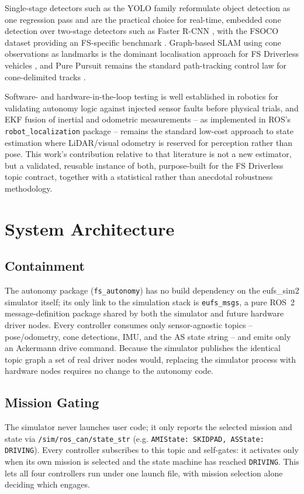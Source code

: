 \documentclass[conference]{IEEEtran}
\begin{document}
Single-stage detectors such as the YOLO family reformulate object detection as one regression pass and are the practical choice for real-time, embedded cone detection over two-stage detectors such as Faster R-CNN \cite{redmon2016}, with the FSOCO dataset providing an FS-specific benchmark \cite{bulter2021}. Graph-based SLAM using cone observations as landmarks is the dominant localisation approach for FS Driverless vehicles \cite{cadena2016}, and Pure Pursuit remains the standard path-tracking control law for cone-delimited tracks \cite{coulter1992}.

Software- and hardware-in-the-loop testing is well established in robotics for validating autonomy logic against injected sensor faults before physical trials, and EKF fusion of inertial and odometric measurements -- as implemented in ROS's \texttt{robot\_localization} package \cite{moore2016} -- remains the standard low-cost approach to state estimation where LiDAR/visual odometry is reserved for perception rather than pose. This work's contribution relative to that literature is not a new estimator, but a validated, reusable instance of both, purpose-built for the FS Driverless topic contract, together with a statistical rather than anecdotal robustness methodology.

\section{System Architecture}
\label{sec:architecture}

\subsection{Containment}
The autonomy package (\texttt{fs\_autonomy}) has no build dependency on the eufs\_sim2 simulator itself; its only link to the simulation stack is \texttt{eufs\_msgs}, a pure ROS~2 message-definition package shared by both the simulator and future hardware driver nodes. Every controller consumes only sensor-agnostic topics -- pose/odometry, cone detections, IMU, and the AS state string -- and emits only an Ackermann drive command. Because the simulator publishes the identical topic graph a set of real driver nodes would, replacing the simulator process with hardware nodes requires no change to the autonomy code.

\subsection{Mission Gating}
The simulator never launches user code; it only reports the selected mission and state via \texttt{/sim/ros\_can/state\_str} (e.g. \texttt{AMIState: SKIDPAD, ASState: DRIVING}). Every controller subscribes to this topic and self-gates: it activates only when its own mission is selected and the state machine has reached \texttt{DRIVING}. This lets all four controllers run under one launch file, with mission selection alone deciding which engages.
\end{document}
